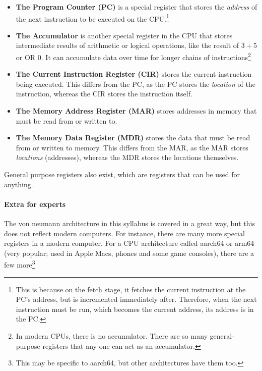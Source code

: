 \documentclass[../main.tex]{subfiles}
\begin{document}
\begin{itemize}
    \item \textbf{The Program Counter (PC)} is a special register that stores the \emph{address} of the next instruction to be executed on the CPU.\footnote{This is because on the fetch stage, it fetches the current instruction at the PC's address, but is incremented immediately after. Therefore, when the next instruction must be run, which becomes the current address, its address is in the PC.}
\item \textbf{The Accumulator} is another special register in the CPU that stores intermediate results of arithmetic or logical operations, like the result of $3+5$ or { OR 0}. It can accumulate data over time for longer chains of instructions\footnote{In modern CPUs, there is no accumulator. There are so many general-purpose registers that any one can act as an accumulator.}
    \item \textbf{The Current Instruction Register (CIR)} stores the current instruction being executed. This differs from the PC, as the PC stores the \emph{location} of the instruction, whereas the CIR stores the instruction itself.
    \item \textbf{The Memory Address Register (MAR)} stores addresses in memory that must be read from or written to.
    \item \textbf{The Memory Data Register (MDR)} stores the data that must be read from or written to memory. This differs from the MAR, as the MAR stores \emph{locations} (addresses), whereas the MDR stores the locations themselves.
\end{itemize}

General purpose registers also exist, which are registers that can be used for anything.

\paragraph{Extra for experts}

The von neumann architecture in this syllabus is covered in a great way, but this does not reflect modern computers. For instance, there are many more special registers in a modern computer. For a CPU architecture called {\mono aarch64} or {\mono arm64} (very popular; used in Apple Macs, phones and some game consoles), there are a few more\footnote{This may be specific to aarch64, but other architectures have them too.}
\end{document}

